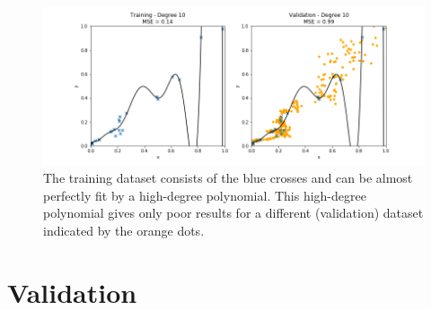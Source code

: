 \documentclass[12pt]{report}
\begin{document}
\begin{figure}[htbp]
	\centering
	\includegraphics[width=\textwidth]{OverfittedPolyn.png}  
	\caption{The training dataset consists of the blue crosses and can be almost perfectly 
		fit by a high-degree polynomial. This high-degree polynomial gives only poor results 
		for a different (validation) dataset indicated by the orange dots.}
	\label{fig_polyn_training}
\end{figure}


\section{Validation}
\label{sec_validate_predictor}
\end{document}
